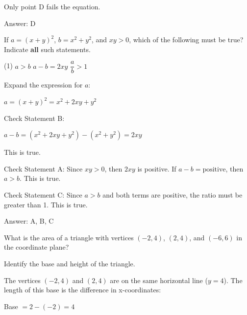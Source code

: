 \documentclass[11pt,paper=a4,answers]{exam}
\begin{document}
\begin{questions}
\begin{solution}
Only point D fails the equation.

Answer: \colorbox{yellow!100}{D}
\end{solution}

\vspace{1cm}

\question
If $a = (x+y)^2$, $b = x^2 + y^2$, and $xy > 0$, which of the following must be true?
Indicate \textbf{all} such statements.

\begin{tasks}(1)
\task[A)] $a > b$
\task[B)] $a - b = 2xy$
\task[C)] $\dfrac{a}{b} > 1$
\end{tasks}

\begin{solution}
Expand the expression for $a$:
\begin{center}
$a = (x+y)^2 = x^2 + 2xy + y^2$
\end{center}
\vspace{5pt}

Check Statement B:
\begin{center}
$a - b = (x^2 + 2xy + y^2) - (x^2 + y^2) = 2xy$
\end{center}
This is true.
\vspace{5pt}

Check Statement A:
Since $xy > 0$, then $2xy$ is positive. 
If $a - b = \text{positive}$, then $a > b$. 
This is true.
\vspace{5pt}

Check Statement C:
Since $a > b$ and both terms are positive, the ratio must be greater than 1.
This is true.

Answer: \colorbox{yellow!100}{A, B, C}
\end{solution}

\vspace{1cm}


\question
What is the area of a triangle with vertices $(-2, 4)$, $(2, 4)$, and $(-6, 6)$ in the coordinate plane?

\begin{solution}
Identify the base and height of the triangle.
\vspace{5pt}

The vertices $(-2, 4)$ and $(2, 4)$ are on the same horizontal line ($y=4$).
The length of this base is the difference in x-coordinates:
\begin{center}
Base $= 2 - (-2) = 4$
\end{center}
\vspace{5pt}


\end{solution}
\end{questions}
\end{document}
